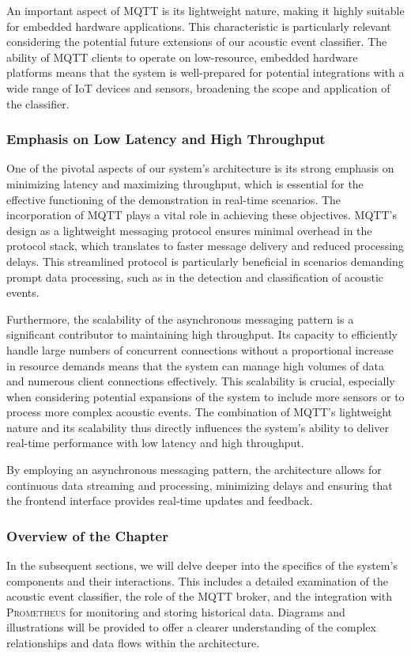 An important aspect of MQTT is its lightweight nature, making it highly suitable for embedded hardware applications. This characteristic is particularly relevant considering the potential future extensions of our acoustic event classifier. The ability of MQTT clients to operate on low-resource, embedded hardware platforms means that the system is well-prepared for potential integrations with a wide range of IoT devices and sensors, broadening the scope and application of the classifier.

\subsubsection{Emphasis on Low Latency and High Throughput}
One of the pivotal aspects of our system's architecture is its strong emphasis on minimizing latency and maximizing throughput, which is essential for the effective functioning of the demonstration in real-time scenarios. The incorporation of MQTT plays a vital role in achieving these objectives. MQTT's design as a lightweight messaging protocol ensures minimal overhead in the protocol stack, which translates to faster message delivery and reduced processing delays\cite{Mishra_2018}. This streamlined protocol is particularly beneficial in scenarios demanding prompt data processing, such as in the detection and classification of acoustic events.

Furthermore, the scalability of the asynchronous messaging pattern is a significant contributor to maintaining high throughput. Its capacity to efficiently handle large numbers of concurrent connections without a proportional increase in resource demands means that the system can manage high volumes of data and numerous client connections effectively. This scalability is crucial, especially when considering potential expansions of the system to include more sensors or to process more complex acoustic events. The combination of MQTT's lightweight nature and its scalability thus directly influences the system's ability to deliver real-time performance with low latency and high throughput.

By employing an asynchronous messaging pattern, the architecture allows for continuous data streaming and processing, minimizing delays and ensuring that the frontend interface provides real-time updates and feedback.

\subsubsection{Overview of the Chapter}
In the subsequent sections, we will delve deeper into the specifics of the system's components and their interactions. This includes a detailed examination of the acoustic event classifier, the role of the MQTT broker, and the integration with \textsc{Prometheus} for monitoring and storing historical data. Diagrams and illustrations will be provided to offer a clearer understanding of the complex relationships and data flows within the architecture.

